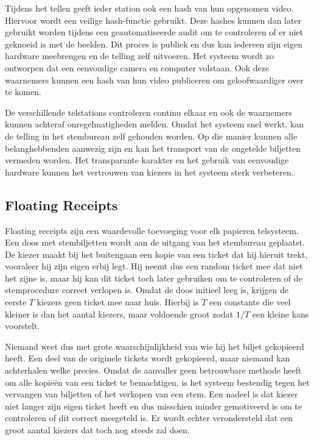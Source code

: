 \npar Tijdens het tellen geeft ieder station ook een hash van hun opgenomen video. Hiervoor wordt een veilige hash-functie gebruikt. Deze hashes kunnen dan later gebruikt worden tijdens een geautomatiseerde audit om te controleren of er niet geknoeid is met de beelden. Dit proces is publiek en dus kan iedereen zijn eigen hardware meebrengen en de telling zelf uitvoeren. Het systeem wordt zo ontworpen dat een eenvoudige camera en computer volstaan. Ook deze waarnemers kunnen een hash van hun video publiceren om geloofwaardiger over te komen.

\npar De verschillende telstations controleren continu elkaar en ook de waarnemers kunnen achteraf onregelmatigheden melden. Omdat het systeem snel werkt, kan de telling in het stembureau zelf gehouden worden. Op die manier kunnen alle belanghebbenden aanwezig zijn en kan het transport van de ongetelde biljetten vermeden worden. Het transparante karakter en het gebruik van eenvoudige hardware kunnen het vertrouwen van kiezers in het systeem sterk verbeteren.

\subsection{Floating Receipts}
\label{sec:ls:floating_receipts}

Floating receipts\cite{rivest_smith_three_voting_protocols} zijn een waardevolle toevoeging voor elk papieren telsysteem. Een doos met stembiljetten wordt aan de uitgang van het stembureau geplaatst. De kiezer maakt bij het buitengaan een kopie van een ticket dat hij hieruit trekt, vooraleer hij zijn eigen erbij legt. Hij neemt dus een random ticket mee dat niet het zijne is, maar hij kan dit ticket toch later gebruiken om te controleren of de stemprocedure correct verlopen is. Omdat de doos initieel leeg is, krijgen de eerste $T$ kiezers geen ticket mee naar huis. Hierbij is $T$ een constante die veel kleiner is dan het aantal kiezers, maar voldoende groot zodat $1/T$ een kleine kans voorstelt.

\npar Niemand weet dus met grote waarschijnlijkheid van wie hij het biljet gekopieerd heeft. Een deel van de originele tickets wordt gekopieerd, maar niemand kan achterhalen welke precies. Omdat de aanvaller geen betrouwbare methode heeft om alle kopie\"en van een ticket te bemachtigen, is het systeem bestendig tegen het vervangen van biljetten of het verkopen van een stem. Een nadeel is dat kiezer niet langer zijn eigen ticket heeft en dus misschien minder gemotiveerd is om te controleren of dit correct meegeteld is. Er wordt echter verondersteld dat een groot aantal kiezers dat toch nog steeds zal doen.

